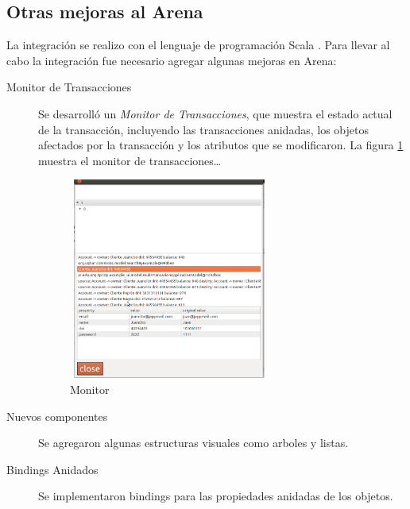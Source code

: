 \subsection{Otras mejoras al Arena}
	La integración se realizo con el lenguaje de programación Scala
	\cite{???}. Para llevar al cabo la integración fue necesario agregar algunas
	mejoras en Arena:
	\begin{description}
	  \item[Monitor de Transacciones]
		 Se desarrolló un \emph{Monitor de Transacciones}, que 
		 muestra el estado actual de la transacción, incluyendo las transacciones
		 anidadas, los objetos afectados por la transacción y los
		 atributos que se modificaron.
		La figura \ref{monitor} muestra el monitor de transacciones\ldots
		
		\begin{figure}[h]
			\centering
			\includegraphics[width=250px, height=250px]{img/monitorTransacciones.png}
			\caption{Monitor}
			\label{monitor}
		\end{figure}	
	
	  \item[Nuevos componentes] Se agregaron algunas estructuras visuales como
	  arboles y listas.
	  \item[Bindings Anidados] Se implementaron bindings para las propiedades
	  anidadas de los objetos.
	\end{description}
